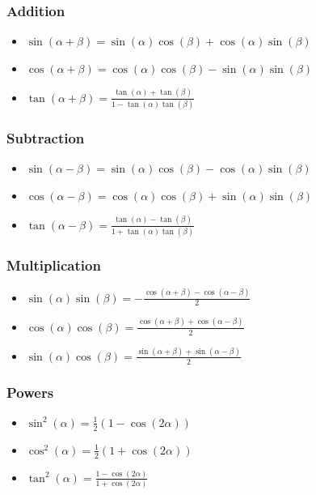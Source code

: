 \documentclass[a4paper,fontsize = 8pt]{scrartcl}
\begin{document}
\subsubsection{Addition}
\begin{itemize}
 \item $\sin(\alpha + \beta) = \sin(\alpha) \cos(\beta) + \cos(\alpha) \sin(\beta)$
 \item $\cos(\alpha + \beta) = \cos(\alpha) \cos(\beta) - \sin(\alpha) \sin(\beta)$
 \item $\tan(\alpha + \beta) = \frac{\tan(\alpha) + \tan(\beta)}{1 - \tan(\alpha) \tan(\beta)}$
\end{itemize}

\subsubsection{Subtraction}
\begin{itemize}
 \item $\sin(\alpha - \beta) = \sin(\alpha) \cos(\beta) - \cos(\alpha)\sin(\beta)$
 \item $\cos(\alpha - \beta) = \cos(\alpha) \cos(\beta) + \sin(\alpha)\sin(\beta)$
 \item $\tan(\alpha - \beta) = \frac{\tan(\alpha) - \tan(\beta)}{1+\tan(\alpha) \tan(\beta)}$
\end{itemize}

\subsubsection{Multiplication}
\begin{itemize}
 \item $\sin(\alpha) \sin(\beta) = -\frac{\cos(\alpha + \beta) - \cos(\alpha - \beta)}{2}$
 \item $\cos(\alpha) \cos(\beta) =  \frac{\cos(\alpha + \beta) + \cos(\alpha - \beta)}{2}$
 \item $\sin(\alpha) \cos(\beta) =  \frac{\sin(\alpha + \beta) + \sin(\alpha - \beta)}{2}$
\end{itemize}

\subsubsection{Powers}
\begin{itemize}
 \item $\sin^2(\alpha) = \frac{1}{2}(1-\cos(2\alpha))$
 \item $\cos^2(\alpha) = \frac{1}{2}(1+\cos(2\alpha))$
 \item $\tan^2(\alpha) = \frac{1-\cos(2\alpha)}{1+\cos(2\alpha)}$
\end{itemize}
\end{document}
